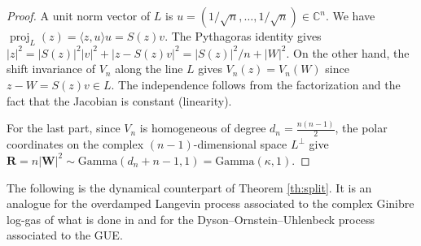 \documentclass[11pt,reqno]{amsart}
\numberwithin{equation}{section}%
\numberwithin{figure}{section}%
\numberwithin{table}{section}
\theoremstyle{plain}
\theoremstyle{definition}
\begin{document}
\begin{proof}
  A unit norm vector of $L$ is
  $u=(1/\sqrt{n},\ldots,1/\sqrt{n})\in\mathbb{C}^n$. We have
  $\operatorname{proj}_L(z)=\langle z,u\rangle u=S(z)v$. The Pythagoras
  identity gives $|z|^2=|S(z)|^2|v|^2+|z-S(z)v|^2=|S(z)|^2/n+|W|^2$. On the
  other hand, the shift invariance of $V_n$ along the line $L$ gives
  $V_n(z)=V_n(W)$ since $z-W=S(z)v\in L$. The independence follows from the
  factorization and the fact that the Jacobian is constant (linearity).

  For the last part, since $V_n$ is homogeneous of degree
  $d_n=\frac{n(n-1)}{2}$, the polar coordinates on the complex
  $(n-1)$-dimensional space $L^\perp$ give
  $\mathbf{R}=n|\mathbf{W}|^2\sim\mathrm{Gamma}(d_n+n-1,1)=\mathrm{Gamma}(\kappa,1)$.
\end{proof}

The following is the dynamical counterpart of Theorem \ref{th:split}. It is an
analogue for the overdamped Langevin process associated to the complex Ginibre
log-gas of what is done in \cite{ChafaiFathiCutoff} and
\cite{BoursierChafaiLabbe} for the Dyson--Ornstein--Uhlenbeck process
associated to the GUE.
\end{document}
